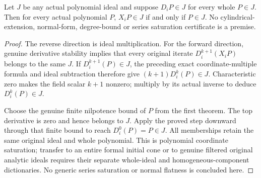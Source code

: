 \begin{theorem}
\label{hir:actual-pderiv-stable-polynomial-coordinate-saturation}
\leanok
Let $J$ be any actual polynomial ideal and suppose $D_iP\in J$ for
every whole $P\in J$. Then for every actual polynomial $P$,
$X_iP\in J$ if and only if $P\in J$.
No cylindrical-extension, normal-form, degree-bound or series
saturation certificate is a premise.
\end{theorem}
\begin{proof}
The reverse direction is ideal multiplication. For the forward
direction, genuine derivative stability implies that every original
iterate $D_i^{k+1}(X_iP)$ belongs to the same $J$. If
$D_i^{k+1}(P)\in J$, the preceding exact coordinate-multiple formula
and ideal subtraction therefore give $(k+1)D_i^k(P)\in J$.
Characteristic zero makes the field scalar $k+1$ nonzero; multiply
by its actual inverse to deduce $D_i^k(P)\in J$.

Choose the genuine finite nilpotence bound of $P$ from the first
theorem. The top derivative is zero and hence belongs to $J$.
Apply the proved step downward through that finite bound to reach
$D_i^0(P)=P\in J$. All memberships retain the same original ideal
and whole polynomial. This is polynomial coordinate saturation;
transfer to an entire formal initial cone or to genuine filtered
original analytic ideals requires their separate whole-ideal and
homogeneous-component dictionaries. No generic series saturation or
normal flatness is concluded here.
\end{proof}
